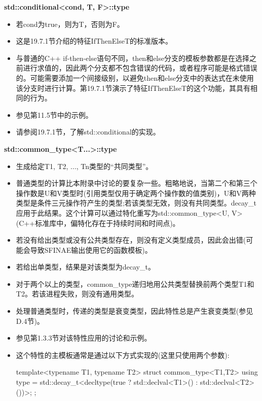 \textbf{std::conditional<cond, T, F>::type}

\begin{itemize}
\item
若cond为true，则为T，否则为F。

\item
这是19.7.1节介绍的特征IfThenElseT的标准版本。

\item
与普通的C++ if-then-else语句不同，then和else分支的模板参数都是在选择之前进行求值的，因此两个分支都不包含错误的代码，或者程序可能是格式错误的。可能需要添加一个间接级别，以避免then和else分支中的表达式在未使用该分支时进行计算。第19.7.1节演示了特征IfThenElseT的这个功能，其具有相同的行为。

\item
参见第11.5节中的示例。

\item
请参阅19.7.1节，了解std::conditional的实现。
\end{itemize}

\textbf{std::common\_type<T...>::type}

\begin{itemize}
\item
生成给定T1, T2, ..., Tn类型的“共同类型”。

\item
普通类型的计算比本附录中讨论的要复杂一些。粗略地说，当第二个和第三个操作数是U和V类型时(引用类型仅用于确定两个操作数的值类别)，U和V两种类型是条件三元操作符产生的类型;若该类型无效，则没有共同类型。decay\_t应用于此结果。这个计算可以通过特化重写为std::common\_type<U, V>(C++标准库中，偏特化存在于持续时间和时间点)。

\item
若没有给出类型或没有公共类型存在，则没有定义类型成员，因此会出错(可能会导致SFINAE输出使用它的函数模板)。

\item
若给出单类型，结果是对该类型为decay\_t。

\item
对于两个以上的类型，common\_type递归地用公共类型替换前两个类型T1和T2。若该进程失败，则没有通用类型。

\item
处理普通类型时，传递的类型是衰变类型，因此特性总是产生衰变类型(参见D.4节)。

\item
参见第1.3.3节对该特性应用的讨论和示例。

\item
这个特性的主模板通常是通过以下方式实现的(这里只使用两个参数):

\begin{cpp}
template<typename T1, typename T2>
struct common_type<T1,T2> {
	using type = std::decay_t<decltype(true ? std::declval<T1>()
	: std::declval<T2>())>;
};
\end{cpp}
\end{itemize}

